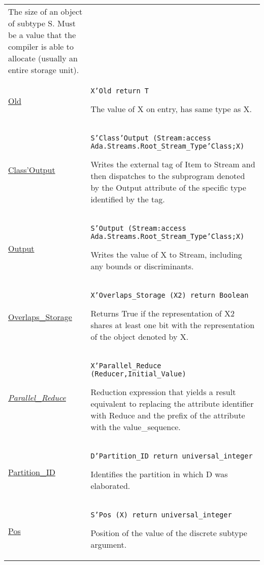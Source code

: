 \documentclass[english]{article}
\begin{document}
\begin{scriptsize}
\begin{multicols*}{3}
\begin{tabular}{@{}p{2cm}p{6.5cm}}
   The size of an object of subtype S. Must be a value that the compiler is able to allocate (usually an entire storage unit).\\

   \href{http://www.ada-auth.org/standards/22rm/html/RM-K-2.html}{Old} & \texttt{X'Old return T}

   The value of X on entry, has same type as X.\\

   \href{http://www.ada-auth.org/standards/22rm/html/RM-K-2.html}{Class'Output} & \texttt{S'Class'Output (Stream:access Ada.Streams.Root\_Stream\_Type'Class;X)}

   Writes the external tag of Item to Stream and then dispatches to the subprogram denoted by the Output attribute of the specific type identified by the tag.\\

   \href{http://www.ada-auth.org/standards/22rm/html/RM-K-2.html}{Output} & \texttt{S'Output (Stream:access Ada.Streams.Root\_Stream\_Type'Class;X)}

   Writes the value of X to Stream, including any bounds or discriminants.\\

   \href{http://www.ada-auth.org/standards/22rm/html/RM-K-2.html}{Overlaps\_Storage} & \texttt{X'Overlaps\_Storage (X2) return Boolean}

   Returns True if the representation of X2 shares at least one bit with the representation of the object denoted by X.\\

   \href{http://www.ada-auth.org/standards/22rm/html/RM-K-2.html}{\textit{Parallel\_Reduce}} & \texttt{X'Parallel\_Reduce (Reducer,Initial\_Value)}

   Reduction expression that yields a result equivalent to replacing the attribute identifier with Reduce and the prefix of the attribute with the value\_sequence.\\

   \href{http://www.ada-auth.org/standards/22rm/html/RM-K-2.html}{Partition\_ID} & \texttt{D'Partition\_ID return universal\_integer}

   Identifies the partition in which D was elaborated.\\

   \href{http://www.ada-auth.org/standards/22rm/html/RM-K-2.html}{Pos} & \texttt{S'Pos (X) return universal\_integer}

   Position of the value of the discrete subtype argument.\\


\end{tabular}
\end{multicols*}
\end{scriptsize}
\end{document}

